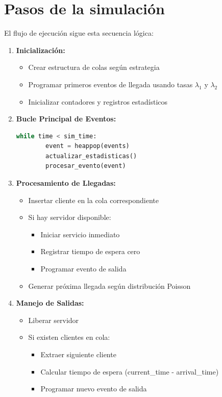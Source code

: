 \documentclass[letterpaper, 12pt]{report}
\begin{document}
\section{Pasos de la simulación}


El flujo de ejecución sigue esta secuencia lógica:

\begin{enumerate}[leftmargin=1.5cm]
    \item \textbf{Inicialización:}
    \begin{itemize}
        \item Crear estructura de colas según estrategia
        \item Programar primeros eventos de llegada usando tasas $\lambda_1$ y $\lambda_2$
        \item Inicializar contadores y registros estadísticos
    \end{itemize}
    
    \item \textbf{Bucle Principal de Eventos:}
    \begin{lstlisting}[language=Python]
    while time < sim_time:
        event = heappop(events)
        actualizar_estadisticas()
        procesar_evento(event)
    \end{lstlisting}
    
    \item \textbf{Procesamiento de Llegadas:}
    \begin{itemize}
        \item Insertar cliente en la cola correspondiente
        \item Si hay servidor disponible:
        \begin{itemize}
            \item Iniciar servicio inmediato
            \item Registrar tiempo de espera cero
            \item Programar evento de salida
        \end{itemize}
        \item Generar próxima llegada según distribución Poisson
    \end{itemize}
    
    \item \textbf{Manejo de Salidas:}
    \begin{itemize}
        \item Liberar servidor
        \item Si existen clientes en cola:
        \begin{itemize}
            \item Extraer siguiente cliente
            \item Calcular tiempo de espera (current\_time - arrival\_time)
            \item Programar nuevo evento de salida
        \end{itemize}
    \end{itemize}
    

\end{enumerate}
\end{document}
